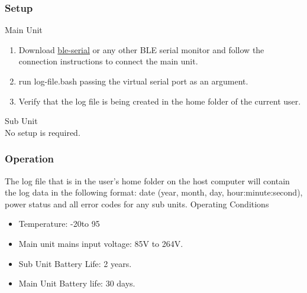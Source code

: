 \subsubsection{Setup}
\large{Main Unit}
\normalsize
\begin{enumerate}
  \item Download \href{https://pypi.org/project/ble-serial/}{ble-serial} or any other BLE serial monitor and follow the connection instructions to connect the main unit.
  \item run log-file.bash passing the virtual serial port as an argument.
  \item Verify that the log file is being created in the home folder of the current user.
\end{enumerate}
\large{Sub Unit\\}
\normalsize
No setup is required.
\subsubsection{Operation}
The log file that is in the user's home folder on the host computer will contain the log data in the following format: date (year, month, day, hour:minute:second), power status and all error codes for any sub units.
\large{Operating Conditions}
\normalsize
\begin{itemize}
  \item Temperature: -20\textcelsius to 95\textcelsius
  \item Main unit mains input voltage: 85\si{\V} to 264\si{\V}.
  \item Sub Unit Battery Life: 2 years.
  \item Main Unit Battery life: 30 days.
\end{itemize}
